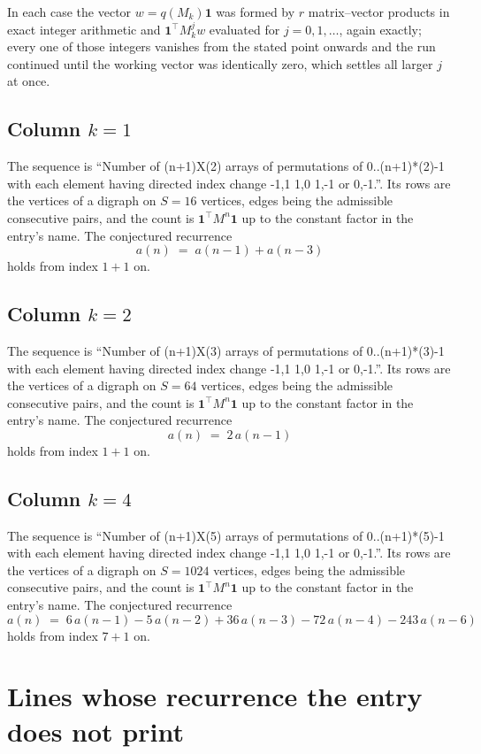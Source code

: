 \documentclass[11pt,a4paper]{article}
\theoremstyle{plain}
\theoremstyle{definition}
\begin{document}
In each case the vector $w=q(M_k)\mathbf{1}$ was formed by $r$ matrix--vector products in
exact integer arithmetic and $\mathbf{1}^{\!\top}M_k^{j}w$ evaluated for $j=0,1,\dots$,
again exactly; every one of those integers vanishes from the stated point onwards and the run
continued until the working vector was identically zero, which settles all larger $j$ at once.

\subsection*{Column $k$$=1$}
The sequence is ``Number of (n+1)X(2) arrays of permutations of 0..(n+1)*(2)-1 with each element having directed index change -1,1 1,0 1,-1 or 0,-1.''. Its rows are the vertices of a digraph on
$S=16$ vertices, edges being the admissible consecutive pairs, and the count is
$\mathbf{1}^{\!\top}M^{n}\mathbf{1}$ up to the constant factor in the entry's name.
The conjectured recurrence
\[
a(n)\;=\;a(n-1) + a(n-3)
\]
holds from index $1+1$ on.

\subsection*{Column $k$$=2$}
The sequence is ``Number of (n+1)X(3) arrays of permutations of 0..(n+1)*(3)-1 with each element having directed index change -1,1 1,0 1,-1 or 0,-1.''. Its rows are the vertices of a digraph on
$S=64$ vertices, edges being the admissible consecutive pairs, and the count is
$\mathbf{1}^{\!\top}M^{n}\mathbf{1}$ up to the constant factor in the entry's name.
The conjectured recurrence
\[
a(n)\;=\;2\,a(n-1)
\]
holds from index $1+1$ on.

\subsection*{Column $k$$=4$}
The sequence is ``Number of (n+1)X(5) arrays of permutations of 0..(n+1)*(5)-1 with each element having directed index change -1,1 1,0 1,-1 or 0,-1.''. Its rows are the vertices of a digraph on
$S=1024$ vertices, edges being the admissible consecutive pairs, and the count is
$\mathbf{1}^{\!\top}M^{n}\mathbf{1}$ up to the constant factor in the entry's name.
The conjectured recurrence
\[
a(n)\;=\;6\,a(n-1) - 5\,a(n-2) + 36\,a(n-3) - 72\,a(n-4) - 243\,a(n-6)
\]
holds from index $7+1$ on.


\section{Lines whose recurrence the entry does not print}
\end{document}
